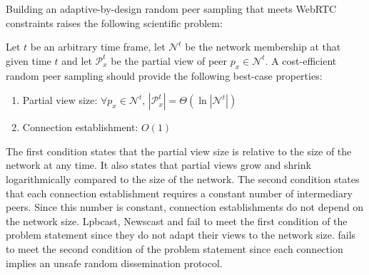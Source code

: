 Building an adaptive-by-design random peer sampling that meets WebRTC
constraints raises the following scientific problem:
\begin{problem}
  Let $t$ be an arbitrary time frame, let $\mathcal{N}^t$ be the network
  membership at that given time $t$ and let $\mathcal{P}_x^t$ be the partial
  view of peer $p_x \in \mathcal{N}^t$.  A cost-efficient random peer sampling
  should provide the following best-case properties:
  \begin{enumerate}
  \item Partial view size: \hfill
    $\forall p_x \in \mathcal{N}^t,\, |\mathcal{P}_x^t| = \Theta (\ln
    |\mathcal{N}^t|)$      
  \item Connection establishment: \hfill $O(1)$
  \end{enumerate}
\end{problem}

The first condition states that the partial view size is relative to the size
of the network at any time. It also states that partial views grow and shrink
logarithmically compared to the size of the network. The second condition
states that each connection establishment requires a constant number of
intermediary peers. Since this number is constant, connection establishments
do not depend on the network size.
Lpbcast, Newscast and \CYCLON fail to meet the first condition of the problem
statement since they do not adapt their views to the network size. \SCAMP fails
to meet the second condition of the problem statement since each connection
implies an unsafe random dissemination protocol.

